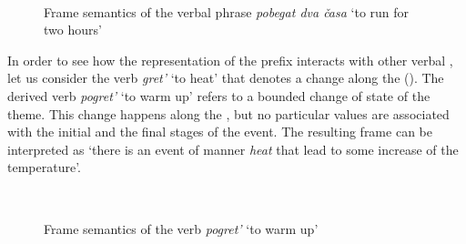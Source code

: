 \begin{figure}
\centering
{}\\
\caption{Frame semantics of the verbal phrase \textit{pobegat dva \v{c}asa} `to run for two hours' \label{frame:pobegat:2hours}}
\end{figure}


In order to see how the representation of the prefix  interacts with other verbal , let us consider the verb \textit{gret'} `to heat' that denotes a change along the  (). The derived verb \textit{pogret'} `to warm up' refers to a bounded change of state of the theme. This change happens along the , but no particular values are associated with the initial and the final stages of the event. The resulting frame can be interpreted as `there is an event of manner \textit{heat} that lead to some increase of the temperature'.

\begin{figure}
\centering
{}\\
\caption{Frame semantics of the verb \textit{pogret'} `to warm up' \label{frame:pogret}}
\end{figure}

